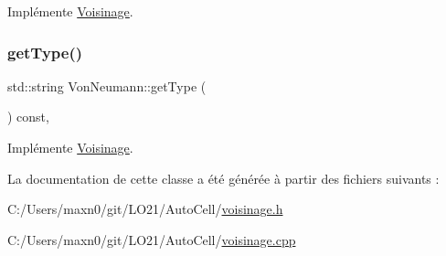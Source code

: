 Implémente \mbox{\hyperlink{class_voisinage_ac12f70bf8e971cbc8eaf8394de270d07}{Voisinage}}.

\mbox{\label{class_von_neumann_ab969490492cff92c8e0efcfc72e492b9}} 
\subsubsection{\texorpdfstring{get\+Type()}{getType()}}
{\footnotesize\ttfamily std\+::string Von\+Neumann\+::get\+Type (\begin{DoxyParamCaption}{ }\end{DoxyParamCaption}) const\hspace{0.3cm}{\ttfamily [inline]}, {\ttfamily [virtual]}}



Implémente \mbox{\hyperlink{class_voisinage_a9853dfde1a68f5bb6333a8db001411a0}{Voisinage}}.



La documentation de cette classe a été générée à partir des fichiers suivants \+:\begin{DoxyCompactItemize}
\item 
C\+:/\+Users/maxn0/git/\+L\+O21/\+Auto\+Cell/\mbox{\hyperlink{voisinage_8h}{voisinage.\+h}}\item 
C\+:/\+Users/maxn0/git/\+L\+O21/\+Auto\+Cell/\mbox{\hyperlink{voisinage_8cpp}{voisinage.\+cpp}}\end{DoxyCompactItemize}
